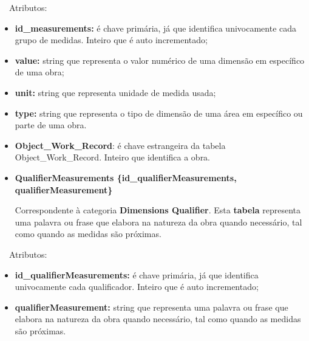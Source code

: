 \documentclass[letterpaper]{article}
\newcommand\textstyleStrongEmphasis[1]{\textbf{#1}}
\newcommand\liststyleLi{%
\renewcommand\labelitemi{{\textbullet}}
\renewcommand\labelitemii{[27A2?]}
\renewcommand\labelitemiii{{\textbullet}}
\renewcommand\labelitemiv{{\textbullet}}
}
\newcommand\liststyleLiv{%
\renewcommand\labelitemi{[27A2?]}
\renewcommand\labelitemii{[27A2?]}
\renewcommand\labelitemiii{[27A2?]}
\renewcommand\labelitemiv{[27A2?]}
}
\newcommand\liststyleLv{%
\renewcommand\labelitemi{[27A2?]}
\renewcommand\labelitemii{[27A2?]}
\renewcommand\labelitemiii{[27A2?]}
\renewcommand\labelitemiv{[27A2?]}
}
\begin{document}
\bigskip

{
\ \ Atributos:}

\liststyleLiv
\begin{itemize}
\item {
\textbf{id\_measurements: }\'e chave prim\'aria, j\'a que identifica
univocamente cada grupo de medidas. Inteiro que \'e auto incrementado;}
\item {
\textbf{value:} string que representa o valor num\'erico de uma
dimens\~ao em espec\'ifico de uma obra;}
\item {
\textbf{unit:} string que representa unidade de medida usada;}
\item {
\textbf{type:} string que representa o tipo de dimens\~ao de uma \'area
em espec\'ifico ou parte de uma obra.}
\item {
\textbf{Object\_Work\_Record}: \'e chave estrangeira da tabela
Object\_Work\_Record. Inteiro que identifica a obra.}
\end{itemize}

\bigskip

\liststyleLi
\begin{itemize}
\item {\bfseries
QualifierMeasurements\textmd{
\{}\textmd{id\_qualifierMeasurements}\textmd{, qualifierMeasurement\}}}

\foreignlanguage{english}{Correspondente \`a categoria
}\foreignlanguage{english}{\textbf{Dimensions
Qualifier}}\foreignlanguage{english}{. Esta
}\textstyleStrongEmphasis{\foreignlanguage{english}{\textmd{tabela}}}\foreignlanguage{english}{
representa uma palavra ou frase que elabora na natureza da obra quando
necess\'ario, tal como quando as medidas s\~ao pr\'oximas.}
\end{itemize}

\bigskip

{
\ \ Atributos:}

\liststyleLv
\begin{itemize}
\item {
\textbf{id\_qualifierMeasurements:} \'e chave prim\'aria, j\'a que
identifica univocamente cada qualificador. Inteiro que \'e auto
incrementado;}
\item {
\textbf{qualifierMeasurement:} string que representa uma palavra ou
frase que elabora na natureza da obra quando necess\'ario, tal como
quando as medidas s\~ao pr\'oximas.}
\end{itemize}
\end{document}
